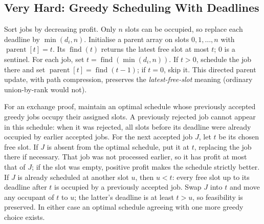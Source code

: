 \documentclass[12pt]{article}
\begin{document}
\subsection*{Very Hard: Greedy Scheduling With Deadlines}
Sort jobs by decreasing profit. Only $n$ slots can be occupied, so
replace each deadline by $\min(d_i,n)$. Initialise a parent array
on slots $0,1,\ldots,n$ with $\operatorname{parent}[t]=t$. Its
$\operatorname{find}(t)$ returns the latest free slot at most $t$;
0 is a sentinel. For each job, set
$t=\operatorname{find}(\min(d_i,n))$. If $t>0$, schedule the job there
and set $\operatorname{parent}[t]=\operatorname{find}(t-1)$; if $t=0$,
skip it. This directed parent update, with path compression, preserves
the \emph{latest-free-slot} meaning (ordinary union-by-rank would not).

For an exchange proof, maintain an optimal schedule whose previously
accepted greedy jobs occupy their assigned slots. A previously
rejected job cannot appear in this schedule: when it was rejected,
all slots before its deadline were already occupied by earlier
accepted jobs. For the next accepted job $J$, let $t$ be its chosen
free slot. If $J$ is absent from the optimal schedule, put it at
$t$, replacing the job there if necessary. That job was not processed
earlier, so it has profit at most that of $J$; if the slot was empty,
positive profit makes the schedule strictly better. If $J$ is already
scheduled at another slot $u$, then $u<t$: every free slot up to
its deadline after $t$ is occupied by a previously accepted job.
Swap $J$ into $t$ and move any occupant of $t$ to $u$; the latter's
deadline is at least $t>u$, so feasibility is preserved. In either
case an optimal schedule agreeing with one more greedy choice exists.
\end{document}
